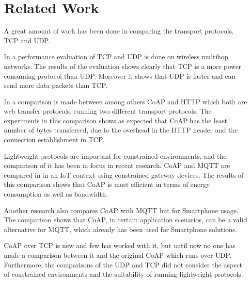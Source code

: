 \section{Related Work}\label{sec:relatedwork}
A great amount of work has been done in comparing the transport protocols, TCP and UDP. 

In \cite{giannoulis2009tcp} a performance evaluation of TCP and UDP is done on wireless multihop networks. The results of the evaluation shows clearly that TCP is a more power consuming protocol than UDP. Moreover it shows that UDP is faster and can send more data packets than TCP.

In \cite{bandyopadhyay2013lightweight} a comparison is made between among others CoAP and HTTP which both are web transfer protocols, running two different transport protocols. The experiments in this comparison shows as expected that CoAP has the least number of bytes transferred, due to the overhead in the HTTP header and the connection establishment in TCP.


Lightweight protocols are important for constrained environments, and the comparison of it has been in focus in recent research.
CoAP and MQTT are compared in \cite{bandyopadhyay2013lightweight} in an IoT context using constrained gateway devices. The results of this comparison shows that CoAP is most efficient in terms of energy consumption as well as bandwidth.

Another research \cite{de2013comparison} also compares CoAP with MQTT but for Smartphone usage. The comparison shows that CoAP, in certain application scenarios, can be a valid alternative for MQTT, which already has been used for Smartphone solutions.

CoAP over TCP is new and few has worked with it, but until now no one has made a comparison between it and the original CoAP which runs over UDP. 
Furthermore, the comparisons of the UDP and TCP did not consider the aspect of constrained environments and the suitability of running lightweight protocols.